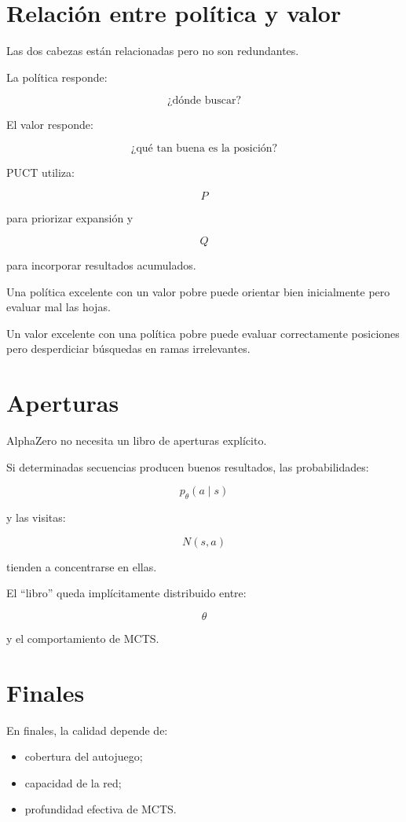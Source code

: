 \documentclass[11pt,a4paper]{article}
\begin{document}
\section{Relación entre política y valor}

Las dos cabezas están relacionadas pero no son redundantes.

La política responde:

\[
\text{¿dónde buscar?}
\]

El valor responde:

\[
\text{¿qué tan buena es la posición?}
\]

PUCT utiliza:

\[
P
\]

para priorizar expansión y

\[
Q
\]

para incorporar resultados acumulados.

Una política excelente con un valor pobre puede orientar bien inicialmente pero evaluar mal las hojas.

Un valor excelente con una política pobre puede evaluar correctamente posiciones pero desperdiciar búsquedas en ramas irrelevantes.

\section{Aperturas}

AlphaZero no necesita un libro de aperturas explícito.

Si determinadas secuencias producen buenos resultados, las probabilidades:

\[
p_\theta(a\mid s)
\]

y las visitas:

\[
N(s,a)
\]

tienden a concentrarse en ellas.

El ``libro'' queda implícitamente distribuido entre:

\[
\theta
\]

y el comportamiento de MCTS.

\section{Finales}

En finales, la calidad depende de:

\begin{itemize}
    \item cobertura del autojuego;
    \item capacidad de la red;
    \item profundidad efectiva de MCTS.
\end{itemize}
\end{document}
